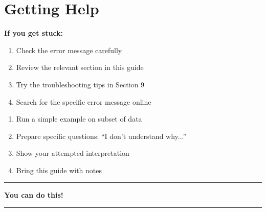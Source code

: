 \documentclass[11pt,a4paper]{article}
\begin{document}
\section{Getting Help}

\textbf{If you get stuck:}
\begin{enumerate}
    \item Check the error message carefully
    \item Review the relevant section in this guide
    \item Try the troubleshooting tips in Section 9
    \item Search for the specific error message online
    
\end{enumerate}


\begin{enumerate}
    \item Run a simple example on subset of data
    \item Prepare specific questions: ``I don't understand why...''
    \item Show your attempted interpretation
    \item Bring this guide with notes
\end{enumerate}

\vspace{1cm}
\begin{center}
\rule{0.8\textwidth}{0.4pt}

\textbf{You can do this!}


\rule{0.8\textwidth}{0.4pt}
\end{center}
\end{document}

